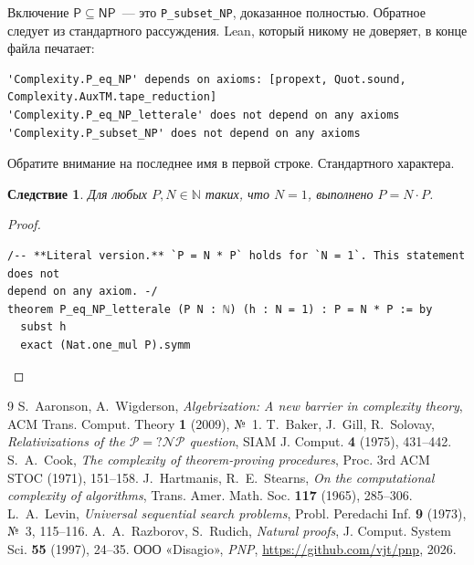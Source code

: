 \documentclass[11pt,a4paper]{amsart}
\newtheorem{corollario}[teorema]{Следствие}
\theoremstyle{remark}
\begin{document}
Включение $\mathsf{P} \subseteq \mathsf{NP}$~--- это \texttt{P\_subset\_NP},
доказанное полностью. Обратное следует из стандартного рассуждения. Lean,
который никому не доверяет, в конце файла печатает:

\begin{listato}[\scriptsize]
\begin{verbatim}
'Complexity.P_eq_NP' depends on axioms: [propext, Quot.sound, Complexity.AuxTM.tape_reduction]
'Complexity.P_eq_NP_letterale' does not depend on any axioms
'Complexity.P_subset_NP' does not depend on any axioms
\end{verbatim}
\end{listato}

\noindent Обратите внимание на последнее имя в первой строке. Стандартного
характера.

\begin{corollario}\label{cor:lett}
Для любых $P, N \in \mathbb{N}$ таких, что $N = 1$, выполнено
$P = N \cdot P$.
\end{corollario}

\begin{proof}
\begin{listato}
\begin{verbatim}
/-- **Literal version.** `P = N * P` holds for `N = 1`. This statement does not
depend on any axiom. -/
theorem P_eq_NP_letterale (P N : ℕ) (h : N = 1) : P = N * P := by
  subst h
  exact (Nat.one_mul P).symm
\end{verbatim}
\end{listato}
\end{proof}

\begin{thebibliography}{9}
 S.~Aaronson, A.~Wigderson,
  \emph{Algebrization: A new barrier in complexity theory},
  ACM Trans. Comput. Theory \textbf{1} (2009), №~1.
 T.~Baker, J.~Gill, R.~Solovay,
  \emph{Relativizations of the $\mathcal{P} =? \mathcal{NP}$ question},
  SIAM J. Comput. \textbf{4} (1975), 431--442.
 S.~A.~Cook,
  \emph{The complexity of theorem-proving procedures},
  Proc. 3rd ACM STOC (1971), 151--158.
 J.~Hartmanis, R.~E.~Stearns,
  \emph{On the computational complexity of algorithms},
  Trans. Amer. Math. Soc. \textbf{117} (1965), 285--306.
 L.~A.~Levin,
  \emph{Universal sequential search problems},
  Probl. Peredachi Inf. \textbf{9} (1973), №~3, 115--116.
 A.~A.~Razborov, S.~Rudich,
  \emph{Natural proofs},
  J. Comput. System Sci. \textbf{55} (1997), 24--35.
 ООО «Disagio»,
  \emph{PNP}, \url{https://github.com/vjt/pnp}, 2026.
\end{thebibliography}
\end{document}
